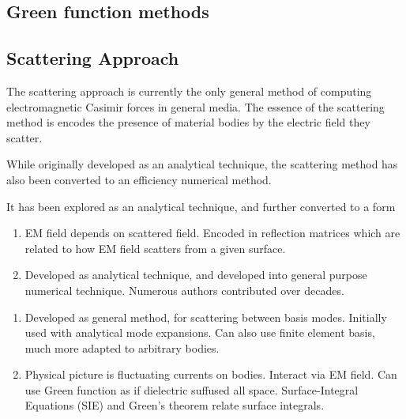 \subsection{Green function methods}


\subsection{Scattering Approach}

The scattering approach is currently the only general method of computing 
electromagnetic Casimir forces in general media.  The essence of the scattering method 
is encodes the presence of material bodies by the electric field they scatter.  

While originally developed as an analytical
technique, the scattering method has also been converted to an efficiency numerical method.  

It has been explored as an analytical technique,
and further converted to a form 
\begin{enumerate}
\item EM field depends on scattered field.  Encoded in reflection matrices
which are related to how EM field scatters from a given surface.  
\item Developed as analytical technique, and developed into general purpose numerical technique.
Numerous authors contributed over decades.
\end{enumerate}

\begin{enumerate}
  \item Developed as general method, for scattering between basis modes.  
    Initially used with analytical mode expansions.  Can also use finite element basis,
    much more adapted to arbitrary bodies.  
\item Physical picture is fluctuating currents on bodies.  Interact via EM field.
  Can use Green function as if dielectric suffused all space.  
Surface-Integral Equations (SIE) and Green's theorem relate surface integrals.  
\end{enumerate}

